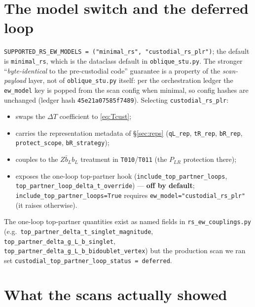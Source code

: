 \documentclass[11pt]{article}
\newcommand{\PLR}{P_{LR}}
\newcommand{\code}[1]{\texttt{#1}}
\theoremstyle{definition}
\begin{document}
\section{The model switch and the deferred loop}
\label{sec:codeswitch}

\code{SUPPORTED\_RS\_EW\_MODELS = ("minimal\_rs", "custodial\_rs\_plr")}; the
default is \code{minimal\_rs}, which is the dataclass default in
\code{oblique\_stu.py}. The stronger ``\emph{byte-identical} to the
pre-custodial code'' guarantee is a property of the \emph{scan-payload} layer,
not of \code{oblique\_stu.py} itself: per the orchestration ledger the
\code{ew\_model} key is popped from the scan config when minimal, so config
hashes are unchanged (ledger hash \code{45e21a07585f7489}). Selecting
\code{custodial\_rs\_plr}:
\begin{itemize}[leftmargin=1.4em]
\item swaps the $\Delta T$ coefficient to \eqref{eq:Tcust};
\item carries the representation metadata of \S\ref{sec:reps}
(\code{qL\_rep}, \code{tR\_rep}, \code{bR\_rep}, \code{protect\_scope},
\code{bR\_strategy});
\item couples to the $Z\bar b_L b_L$ treatment in \code{T010}/\code{T011}
(the $\PLR$ protection there);
\item exposes the one-loop top-partner hook
(\code{include\_top\_partner\_loops}, \code{top\_partner\_loop\_delta\_t\_override})
--- \textbf{off by default}; \code{include\_top\_partner\_loops=True} requires
\code{ew\_model="custodial\_rs\_plr"} (it raises otherwise).
\end{itemize}
The one-loop top-partner quantities exist as named fields in
\code{rs\_ew\_couplings.py} (e.g.\ \code{top\_partner\_delta\_t\_singlet\_magnitude},
\code{top\_partner\_delta\_g\_L\_b\_singlet},
\code{top\_partner\_delta\_g\_L\_b\_bidoublet\_vertex}) but the production scan we
ran set \code{custodial\_top\_partner\_loop\_status = deferred}.

\section{What the scans actually showed}
\label{sec:codescans}
\end{document}
